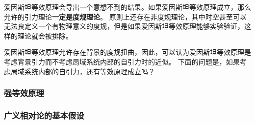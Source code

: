 \documentclass[hyperref, UTF8, a4paper]{ctexart}
\renewcommand{\emph}[1]{\textbf{#1}}
\begin{document}
爱因斯坦等效原理会导出一个意想不到的结果。如果爱因斯坦等效原理成立，那么允许的引力理论\emph{一定是度规理论}。
原则上还存在非度规理论，其中时空甚至可以无法良定义一个有物理意义的度规，但是如果爱因斯坦等效原理能够实验验证，这样的理论就会被排除。

爱因斯坦等效原理允许存在背景的度规扭曲，因此，可以认为爱因斯坦等效原理是考虑背景引力而不考虑局域系统内部的自引力时的近似。
下面的问题是，如果考虑局域系统内部的自引力，还有等效原理成立吗？

\subsubsection{强等效原理}



\subsubsection{广义相对论的基本假设}
\end{document}
